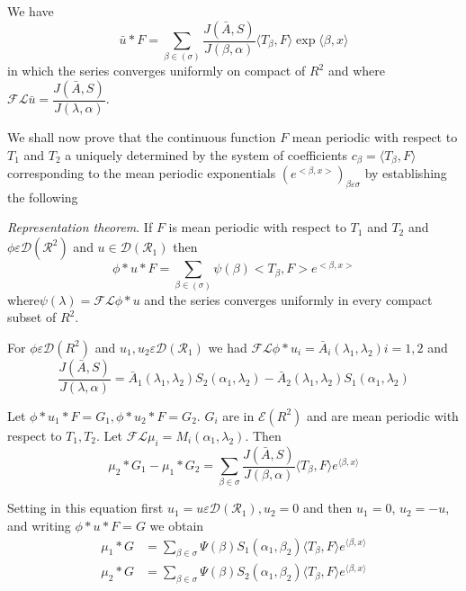 We have
\begin{equation}
  \bar{u} * F = \sum_{ \beta \in (\sigma)} \frac{J (\bar{A},
    S)} {J (\beta, \alpha)} \langle T_\beta, F \rangle \exp \langle
  \beta, x \rangle \tag{6}\label{part2:chap3:sec9:eq6} 
\end{equation}
in which the series converges uniformly on compact of $R^2$ and where
$\mathscr{F} \mathcal{L} \bar{u} = \dfrac{J (\bar{A}, S)} {J (\lambda,
  \alpha)}$.  

We shall now prove that the continuous function $F$ mean periodic with
respect to $T_1$ and $T_2$ a uniquely determined by the system of
coefficients $c_\beta = \langle T_\beta, F \rangle$ corresponding to
the mean periodic exponentials $(e ^{<\beta,x >})_{\beta
  \varepsilon \sigma}$ by establishing the following  

\noindent \textit{Representation theorem}. If $F$ is mean periodic with respect
to $T_1$ and $T_2$ and $\phi \varepsilon \mathscr{D} (\mathscr{R}^2)$
and $u \in \mathscr{D} (\mathscr{R}_1)$ then 
\begin{equation*}
  \phi * u * F = \sum_{ \beta \in (\sigma)} \psi (\beta)
  <T_\beta, F> e ^{<\beta,x>} \tag{7}\label{part2:chap3:sec9:eq7} 
\end{equation*}
where\pageoriginale $\psi (\lambda) = \mathscr{F} \mathcal{L} \phi * u$ and the
series converges uniformly in every compact subset of $R^2$. 

For $\phi \varepsilon \mathscr{D} (R^2)$ and $u_1, u_2 \varepsilon
\mathscr{D} (\mathscr{R}_1)$ we had $\mathscr{F} \mathcal{L} \phi *
u_i = \bar{A}_i (\lambda_1, \lambda_2) i =1,2$ and 
$$
\frac{J (\bar{A},S)} {J (\lambda, \alpha)} = \bar{A}_1 (\lambda_1,
\lambda_2) S_2 (\alpha_1, \lambda_2) -\bar{A}_2 (\lambda_1, \lambda_2)
S_1 (\alpha_1, \lambda_2) 
$$

Let $\phi * u_1 * F = G_1, \phi * u_2 * F = G_2$. $G_i$ are in
$\mathscr{E} (R^2)$ and are mean periodic with respect to
$T_1,T_2$. Let $\mathscr{F} \mathcal{L} \mu_i = M_i (\alpha_1,
\lambda_2)$. Then 
$$
\mu_2 * G_1 - \mu_1 * G_2 = \sum_{\beta \in \sigma} \frac{J
  (\bar{A},S)} {J (\beta, \alpha)} \langle T_\beta, F \rangle
e^{\langle \beta,x\rangle} 
$$

Setting in this equation first $u_1 = u \varepsilon \mathscr{D}
(\mathcal{R}_1), u_2 = 0$ and then $u_1 = 0$, $u_2= -u$, and writing
$\phi * u * F =G$ we obtain 
\begin{align*}
  \mu_1 * G & = \sum_{\beta \in \sigma} \Psi (\beta) S_1
  (\alpha_1, \beta_2) \langle T_\beta, F \rangle e^{\langle \beta,x
    \rangle} \tag{8}\label{part2:chap3:sec9:eq8}\\ 
  \mu_2 * G & = \sum_{\beta \in \sigma} \Psi (\beta) S_2
  (\alpha_1, \beta_2) \langle T_\beta, F \rangle e^{\langle \beta,x
    \rangle} \tag{9}\label{part2:chap3:sec9:eq9}
\end{align*}

